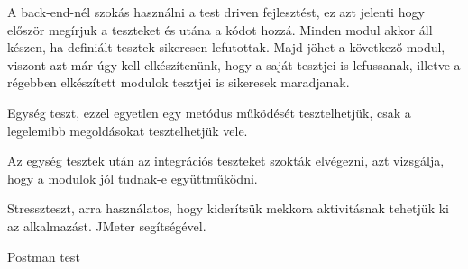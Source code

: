 A back-end-nél szokás használni a test driven fejlesztést, ez azt jelenti hogy először megírjuk a teszteket és utána a kódot hozzá. Minden modul akkor áll készen, ha definiált tesztek sikeresen lefutottak. Majd jöhet a következő modul, viszont azt már úgy kell elkészítenünk, hogy a saját tesztjei is lefussanak, illetve a régebben elkészített modulok tesztjei is sikeresek maradjanak. 

Egység teszt, ezzel egyetlen egy metódus működését tesztelhetjük, csak a  legelemibb megoldásokat tesztelhetjük vele.

Az egység tesztek után az integrációs teszteket szokták elvégezni, azt vizsgálja, hogy a modulok jól tudnak-e együttműködni.

Stresszteszt, arra használatos, hogy kiderítsük mekkora aktivitásnak tehetjük ki az alkalmazást. JMeter segítségével.

Postman test